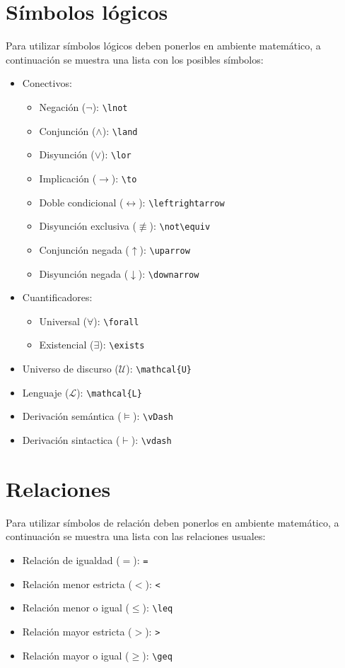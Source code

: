 \documentclass[spanish,12pt,letterpaper]{article}
\theoremstyle{break}
\begin{document}
\section{Símbolos lógicos}
Para utilizar símbolos lógicos deben ponerlos en ambiente matemático, a continuación se muestra una lista con los posibles símbolos:
\begin{itemize}
\item Conectivos:
  \begin{itemize}
  \item Negación ($\lnot$): \verb!\lnot!
  \item Conjunción ($\land$): \verb!\land!
  \item Disyunción ($\lor$): \verb!\lor!
  \item Implicación ($\to$): \verb!\to!
  \item Doble condicional ($\leftrightarrow$): \verb!\leftrightarrow!
  \item Disyunción exclusiva ($\not\equiv$): \verb!\not\equiv!
  \item Conjunción negada ($\uparrow$): \verb!\uparrow!
  \item Disyunción negada ($\downarrow$): \verb!\downarrow!
  \end{itemize}
\item Cuantificadores:
  \begin{itemize}
  \item Universal ($\forall$): \verb!\forall!
  \item Existencial ($\exists$): \verb!\exists!
  \end{itemize}
\item Universo de discurso ($\mathcal{U}$): \verb!\mathcal{U}!
\item Lenguaje ($\mathcal{L}$): \verb!\mathcal{L}!
\item Derivación semántica ($\vDash$): \verb!\vDash!
\item Derivación sintactica ($\vdash$): \verb!\vdash!
\end{itemize}

\section{Relaciones}
Para utilizar símbolos de relación deben ponerlos en ambiente matemático, a continuación se muestra una lista con las relaciones usuales:
\begin{itemize}
\item Relación de igualdad ($=$): \verb!=!
\item Relación menor estricta ($<$): \verb!<!
\item Relación menor o igual ($\leq$): \verb!\leq!
\item Relación mayor estricta ($>$): \verb!>!
\item Relación mayor o igual ($\geq$): \verb!\geq!
\end{itemize}
\end{document}
